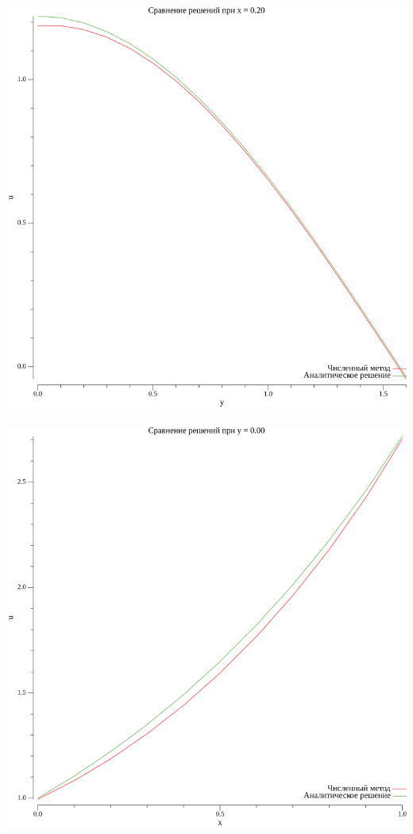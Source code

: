 \documentclass{article}
\begin{document}
\\
\includegraphics[scale=0.6]{0plot_x_0.20.png}
\\

\\
\includegraphics[scale=0.6]{0plot_y_0.00.png}
\\
\end{document}
